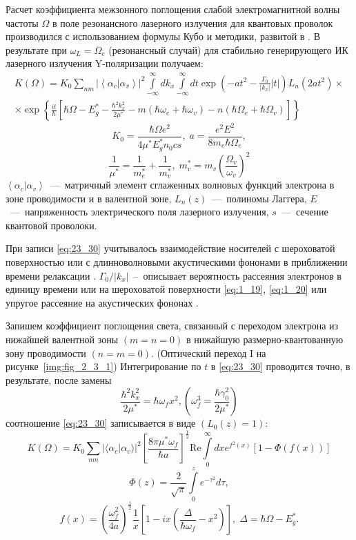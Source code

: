 Расчет коэффициента межзонного поглощения слабой электромагнитной волны частоты $\Omega$ в поле резонансного лазерного излучения для квантовых проволок производился с использованием формулы Кубо \cite{Kubo1957a} и методики, развитой в \cite{Sinyavskii1974}. В результате при $\omega_L = \Omega_e$ (резонансный случай) для стабильно генерирующего ИК лазерного излучения Y-поляризации получаем:
\begin{multline} \label{eq:23_30}
K\left(\Omega\right)=K_0{\sum_{nm}{\left|\left\langle \alpha_c | \alpha_v \right\rangle \right|}}^2 
\int\limits_{-\infty }^{\infty }dk_x \int\limits_{-\infty }^{\infty }{dt \exp{\left( -a t^2 -\frac{\Gamma_0 }{\left|k_x\right|}|t| \right) }} L_n\left(2at^2 \right)\times\\
\times {\exp \left\{\frac{it}{\hbar }\left[\hbar \Omega-E^*_g-\frac{\hbar^2 k^2_x}{2\mu^*}-m\left(\hbar\omega_e+\hbar\omega_v\right)-n\left(\hbar\Omega_e + \hbar\Omega_v \right)\right]\right\}\ }
\end{multline}
\[
K_0=\frac{\hbar \Omega e^2}{4\mu^* E_g^* n_0 c s}, \;
a=\frac{e^2 E^2}{8 m_e \hbar\Omega_e},
\]
\[
\frac{1}{\mu^*}=\frac{1}{m^*_e}+\frac{1}{m^*_v},\;
m^*_v=m_v {\left(\frac{\Omega_v}{\omega_v}\right)}^2
\] 
$\left\langle \alpha_c | \alpha_v \right\rangle $~---~матричный элемент сглаженных волновых функций электрона в зоне проводимости и в валентной зоне, $L_n\left(z\right)$~---~полиномы Лаггера, $E$~---~напряженность электрического поля лазерного излучения, $s$~---~сечение квантовой проволоки. 

При записи \eqref{eq:23_30} учитывалось взаимодействие носителей с шероховатой поверхностью или с длинноволновыми акустическими фононами в приближении времени релаксации \cite{Khamidullin2002}. ${\Gamma_0}/{\left|k_x\right|}$~--~описывает вероятность рассеяния электронов в единицу времени или на шероховатой поверхности \eqref{eq:1_19}, \eqref{eq:1_20}  или упругое рассеяние на акустических фононах \cite{Khamidullin2006}.

Запишем коэффициент поглощения света, связанный с переходом электрона из нижайшей валентной зоны $(m=n=0)$ в нижайшую размерно-квантованную зону проводимости $(n=m=0)$. (Оптический переход I на рисунке~\ref{img:fig_2_3_1}) Интегрирование по $t$ в  \eqref{eq:23_30} проводится точно, в результате, после замены
\[
\frac{{\hbar }^2 k^2_x}{2\mu^*}=\hbar {\omega }_fx^2, \left(\omega^3_f = \frac{\hbar \gamma^2_0}{2\mu^*}\right)
\] 
соотношение  \eqref{eq:23_30} записывается в виде $\left(L_0\left(z\right)=1\right)$:
\begin{equation} \label{eq:23_40}
K\left(\Omega\right)=K_0\sum_{nm}{ {\lvert\langle \alpha_c | \alpha_v \rangle\rvert}^2 {\left[\frac{8\pi \mu^*\omega_f}{\hbar a}\right]}^{\frac{1}{2}} \mathrm{Re} \int\limits_0^\infty {dx e^{f^2\left(x\right)}\left[1-\Phi \left(f\left(x\right)\right)\right]}}
\end{equation}
\[
\Phi \left(z\right)=\frac{2}{\sqrt{\pi}}\int\limits_0^z {e^{-\tau^2}}d\tau ,
\] 
\[
f\left(x\right)={\left(\frac{\omega^2_f}{4a}\right)}^{\frac{1}{2}}\frac{1}{x}\left[1-ix\left(\frac{\Delta }{\hbar \omega_f}-x^2\right)\right],\; \Delta =\hbar \Omega-E^*_g .
\] 

